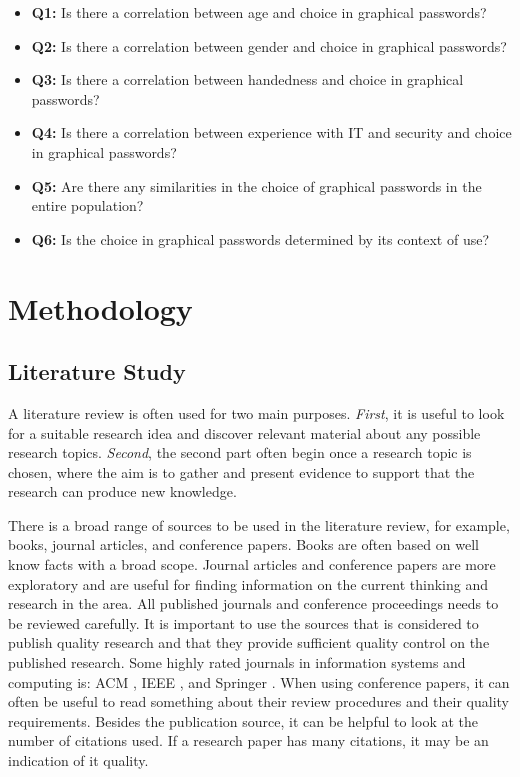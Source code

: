	  {\renewcommand\labelitemi{}
			\begin{itemize}[leftmargin=*]
	  		\item {\bf Q1:} Is there a correlation between age and choice in graphical passwords?
	  		\item {\bf Q2:} Is there a correlation between gender and choice in graphical passwords?
	  		\item {\bf Q3:} Is there a correlation between handedness and choice in graphical passwords?
	  		\item {\bf Q4:} Is there a correlation between experience with IT and security and choice in graphical passwords?
	  		\item {\bf Q5:} Are there any similarities in the choice of graphical passwords in the entire population?
	  		\item {\bf Q6:} Is the choice in graphical passwords determined by its context of use?
	  	\end{itemize}
	  }


	\section{Methodology} \label{sec:researchmethods}


		\subsection{Literature Study}\label{sec:methodliteraturereview}

	    A literature review is often used for two main purposes. {\it First}, it is useful to look for a suitable research idea and discover relevant material about any possible research topics. {\it Second}, the second part often begin once a research topic is chosen, where the aim is to gather and present evidence to support that the research can produce new knowledge.

	    There is a broad range of sources to be used in the literature review, for example, books, journal articles, and conference papers. Books are often based on well know facts with a broad scope. Journal articles and conference papers are more exploratory and are useful for finding information on the current thinking and research in the area. All published journals and conference proceedings needs to be reviewed carefully. It is important to use the sources that is considered to publish quality research and that they provide sufficient quality control on the published research. Some highly rated journals in information systems and computing is: ACM \cite{ACM}, IEEE \cite{IEEE}, and Springer \cite{Springer}. When using conference papers, it can often be useful to read something about their review procedures and their quality requirements. Besides the publication source, it can be helpful to look at the number of citations used. If a research paper has many citations, it may be an indication of it quality.

